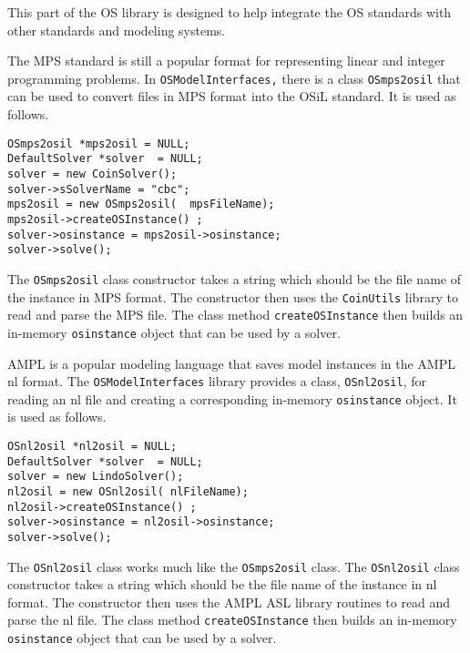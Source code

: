 \label{section:osmodelinterfaces}

This part of the OS library is designed to help integrate the OS standards with other standards and modeling systems.


The MPS standard is still a popular format for representing linear and integer programming problems.
In {\tt OSModelInterfaces,} there is a class {\tt OSmps2osil} that can be used
to convert files in MPS format into the OSiL standard. It is used as follows.

\begin{verbatim}
OSmps2osil *mps2osil = NULL;
DefaultSolver *solver  = NULL;
solver = new CoinSolver();
solver->sSolverName = "cbc";
mps2osil = new OSmps2osil(  mpsFileName);
mps2osil->createOSInstance() ;
solver->osinstance = mps2osil->osinstance;
solver->solve();
\end{verbatim}

The {\tt OSmps2osil} class constructor takes a string which should be the
file name of the instance in MPS format. The constructor then uses the
{\tt CoinUtils} library to read and parse the MPS file.  The class method {\tt createOSInstance} then builds  an in-memory {\tt osinstance} object  that can be used by a solver.

\label{section:nl2osil}

AMPL is a popular modeling language that saves  model instances in the AMPL nl format.
The {\tt OSModelInterfaces} library provides a class, {\tt OSnl2osil},
for reading an nl file and creating a
corresponding in-memory  {\tt osinstance} object. It is used as follows.

\begin{verbatim}
OSnl2osil *nl2osil = NULL;
DefaultSolver *solver  = NULL;
solver = new LindoSolver();
nl2osil = new OSnl2osil( nlFileName);
nl2osil->createOSInstance() ;
solver->osinstance = nl2osil->osinstance;
solver->solve();
\end{verbatim}


The {\tt OSnl2osil} class works much like the {\tt OSmps2osil} class. The
{\tt OSnl2osil} class constructor takes a string which should be the file name of the instance in nl format. The constructor then uses the AMPL ASL library routines to read and parse the nl file. The class method {\tt createOSInstance} then builds  an in-memory {\tt osinstance} object  that can be used by a solver.

